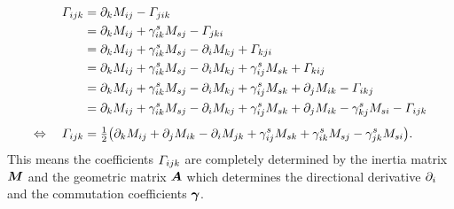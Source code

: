 \begin{align}
 \varGamma_{ijk} &= \partial_{k} M_{ij} - \varGamma_{jik} 
\nonumber\\
 &= \partial_{k} M_{ij} + \gamma^{s}_{ik} M_{sj} - \varGamma_{jki} 
\nonumber\\
 &= \partial_{k} M_{ij} + \gamma^{s}_{ik} M_{sj} - \partial_{i} M_{kj} + \varGamma_{kji}
\nonumber\\
 &= \partial_{k} M_{ij} + \gamma^{s}_{ik} M_{sj} - \partial_{i} M_{kj} + \gamma^{s}_{ij} M_{sk} + \varGamma_{kij}
\nonumber\\
 &= \partial_{k} M_{ij} + \gamma^{s}_{ik} M_{sj} - \partial_{i} M_{kj} + \gamma^{s}_{ij} M_{sk} + \partial_{j} M_{ik} - \varGamma_{ikj}
\nonumber\\
 &= \partial_{k} M_{ij} + \gamma^{s}_{ik} M_{sj} - \partial_{i} M_{kj} + \gamma^{s}_{ij} M_{sk} + \partial_{j} M_{ik} - \gamma^{s}_{kj} M_{si} - \varGamma_{ijk}
\\[1ex]
 \Leftrightarrow \quad
 \varGamma_{ijk} &= \tfrac{1}{2}\big( \partial_{k} M_{ij} + \partial_{j} M_{ik} - \partial_{i} M_{jk} + \gamma^{s}_{ij} M_{sk} + \gamma^{s}_{ik} M_{sj} - \gamma^{s}_{jk} M_{si} \big).
\label{eq:DefConnCoeffL}
\end{align}
This means the coefficients $\varGamma_{ijk}$ are completely determined by the inertia matrix $\boldsymbol{M}$ and the geometric matrix $\boldsymbol{A}$ which determines the directional derivative $\partial_{i}$ and the commutation coefficients $\boldsymbol{\gamma}$.

